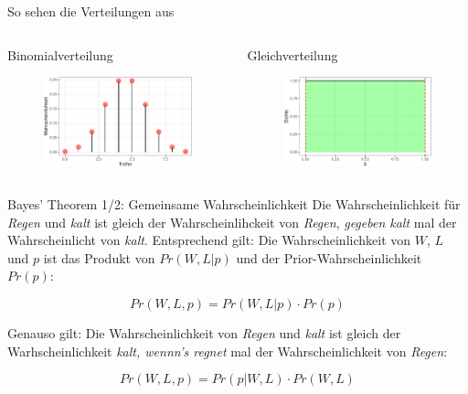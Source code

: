 \documentclass[
  ngerman,
  ignorenonframetext,
]{beamer}
\begin{document}
\begin{frame}{So sehen die Verteilungen aus}
\protect\hypertarget{so-sehen-die-verteilungen-aus}{}
\begin{columns}[T]
\begin{column}{0.5\textwidth}
\begin{block}{Binomialverteilung}
\protect\hypertarget{binomialverteilung}{}
\begin{figure}[H]
\includegraphics[width=0.7\linewidth]{unnamed-chunk-22-1} \end{figure}
\end{block}
\end{column}

\begin{column}{0.5\textwidth}
\begin{block}{Gleichverteilung}
\protect\hypertarget{gleichverteilung}{}
\begin{figure}[H]
\includegraphics[width=0.7\linewidth]{unnamed-chunk-23-1} \end{figure}
\end{block}
\end{column}
\end{columns}
\end{frame}

\begin{frame}{Bayes' Theorem 1/2: Gemeinsame Wahrscheinlichkeit}
\protect\hypertarget{bayes-theorem-12-gemeinsame-wahrscheinlichkeit}{}
Die Wahrscheinlichkeit für \emph{Regen} und \emph{kalt} ist gleich der
Wahrscheinlihckeit von \emph{Regen}, \emph{gegeben kalt} mal der
Wahrscheinlicht von \emph{kalt}. Entsprechend gilt: Die
Wahrscheinlichkeit von \(W\), \(L\) und \(p\) ist das Produkt von
\(Pr(W,L|p)\) und der Prior-Wahrscheinlichkeit \(Pr(p)\):

\[Pr(W,L,p) = Pr(W,L|p) \cdot Pr(p)\]

Genauso gilt: Die Wahrscheinlichkeit von \emph{Regen} und \emph{kalt}
ist gleich der Warhscheinlichkeit \emph{kalt, wennn's regnet} mal der
Wahrscheinlichkeit von \emph{Regen}:

\[Pr(W,L,p) = Pr(p|W,L) \cdot Pr(W, L)\]
\end{frame}
\end{document}
